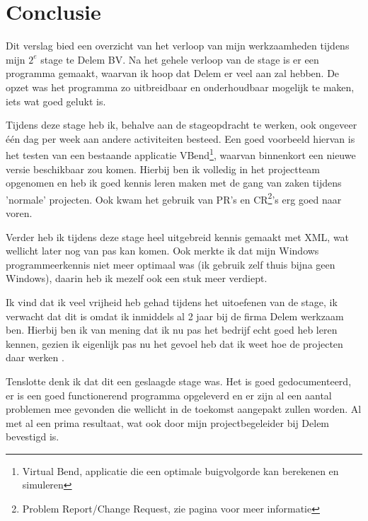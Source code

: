 \chapter{Conclusie}

Dit verslag bied een overzicht van het verloop van mijn werkzaamheden tijdens mijn $2^e$ stage te Delem BV. Na het gehele verloop van de stage is er een programma gemaakt, waarvan ik hoop dat Delem er veel aan zal hebben. De opzet was het programma zo uitbreidbaar en onderhoudbaar mogelijk te maken, iets wat goed gelukt is.

Tijdens deze stage heb ik, behalve aan de stageopdracht te werken, ook ongeveer \'e\'en dag per week aan andere activiteiten besteed. Een goed voorbeeld hiervan is het testen van een bestaande applicatie VBend\footnote{Virtual Bend, applicatie die een optimale buigvolgorde kan berekenen en simuleren}, waarvan binnenkort een nieuwe versie beschikbaar zou komen. Hierbij ben ik volledig in het projectteam opgenomen en heb ik goed kennis leren maken met de gang van zaken tijdens 'normale' projecten. Ook kwam het gebruik van PR's en CR\footnote{Problem Report/Change Request, zie pagina \pageref{PR} voor meer informatie}'s erg goed naar voren.

Verder heb ik tijdens deze stage heel uitgebreid kennis gemaakt met XML, wat wellicht later nog van pas kan komen. Ook merkte ik dat mijn Windows programmeerkennis niet meer optimaal was (ik gebruik zelf thuis bijna geen Windows), daarin heb ik mezelf ook een stuk meer verdiept.

Ik vind dat ik veel vrijheid heb gehad tijdens het uitoefenen van de stage, ik verwacht dat dit is omdat ik inmiddels al 2 jaar bij de firma Delem werkzaam ben. Hierbij ben ik van mening dat ik nu pas het bedrijf echt goed heb leren kennen, gezien ik eigenlijk pas nu het gevoel heb dat ik weet hoe de projecten daar werken .

Tenslotte denk ik dat dit een geslaagde stage was. Het is goed gedocumenteerd, er is een goed functionerend programma opgeleverd en er zijn al een aantal problemen mee gevonden die wellicht in de toekomst aangepakt zullen worden. Al met al een prima resultaat, wat ook door mijn projectbegeleider bij Delem bevestigd is.
